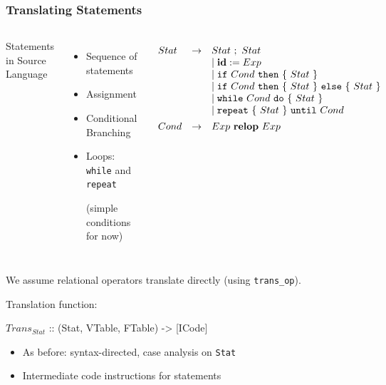 \documentclass{beamer}
\newcommand{\codesize}{\footnotesize}
\newcommand{\cd}[1]{{{\codesize\tt #1}}}
\renewcommand{\emph}[1]{\textcolor{structure}{#1}}
\newcommand{\mymath}[1]{$ #1 $}
\newcommand{\myindx}[1]{_{#1}}
\begin{document}
\begin{frame}[fragile]
	\frametitle{Translating Statements}

\begin{columns}

\emph{Statements in Source Language}
\begin{itemize}
\item Sequence of statements
\item Assignment
\item Conditional Branching
\item Loops: \cd{while} and \cd{repeat}

	(simple conditions for now)
\end{itemize}


{\footnotesize

\renewcommand{\arraystretch}{0.75}
\[\begin{array}{lcl}
Stat & \rightarrow & Stat~;~Stat \\
& & \mid {\bf id} := Exp \\
& & \mid {\tt if}~Cond~{\tt then}~\{~Stat~\} \\
& & \mid {\tt if}~Cond~{\tt then}~\{~Stat~\}~{\tt else}~\{~Stat~\} \\
& & \mid {\tt while}~Cond~{\tt do}~\{~Stat~\} \\
& & \mid {\tt repeat}~\{~Stat~\}~{\tt until}~Cond \\[1ex]
Cond & \rightarrow & Exp~ {\bf relop}~ Exp
\end{array}\]

}
\end{columns}
\smallskip

We assume relational operators translate directly (using \cd{trans\_op}).

\pause

\bigskip
Translation function:

\begin{colorcode}
\mymath{Trans\myindx{Stat}} :: (Stat, VTable, FTable) -> [ICode]
\end{colorcode}

\begin{itemize}
\item As before: syntax-directed, \emph{case analysis} on \cd{Stat}
\item Intermediate code instructions for statements
\end{itemize}

\end{frame}
\end{document}
